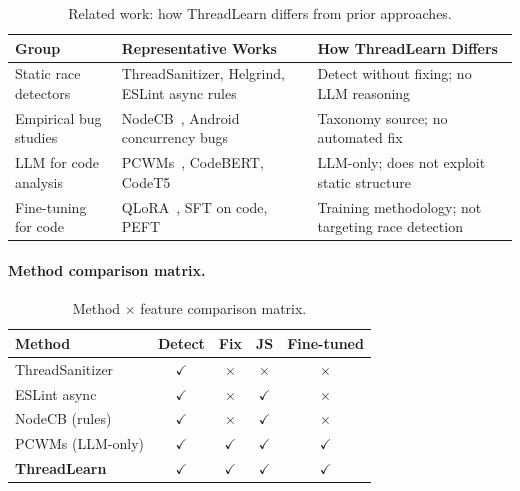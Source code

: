 \documentclass[11pt]{article}
\begin{document}
\begin{table}[ht]
  \centering
  \caption{Related work: how ThreadLearn differs from prior approaches.}
  \label{tab:related}
  \begin{tabular}{@{}p{3.2cm}p{4.5cm}p{4.5cm}@{}}
    \toprule
    \textbf{Group} & \textbf{Representative Works} & \textbf{How ThreadLearn Differs} \\
    \midrule
    Static race detectors
      & ThreadSanitizer, Helgrind, ESLint async rules
      & Detect without fixing; no LLM reasoning \\
    \addlinespace
    Empirical bug studies
      & NodeCB~\cite{nodecb2017}, Android concurrency bugs
      & Taxonomy source; no automated fix \\
    \addlinespace
    LLM for code analysis
      & PCWMs~\cite{pcwms2026}, CodeBERT, CodeT5
      & LLM-only; does not exploit static structure \\
    \addlinespace
    Fine-tuning for code
      & QLoRA~\cite{qlora}, SFT on code, PEFT
      & Training methodology; not targeting race detection \\
    \bottomrule
  \end{tabular}
\end{table}

\paragraph{Method comparison matrix.}

\begin{table}[ht]
  \centering
  \caption{Method $\times$ feature comparison matrix.}
  \label{tab:matrix}
  \begin{tabular}{@{}lcccc@{}}
    \toprule
    \textbf{Method} & \textbf{Detect} & \textbf{Fix} & \textbf{JS} & \textbf{Fine-tuned} \\
    \midrule
    ThreadSanitizer      & $\checkmark$ & $\times$ & $\times$     & $\times$ \\
    ESLint async         & $\checkmark$ & $\times$ & $\checkmark$ & $\times$ \\
    NodeCB (rules)       & $\checkmark$ & $\times$ & $\checkmark$ & $\times$ \\
    PCWMs (LLM-only)     & $\checkmark$ & $\checkmark$ & $\checkmark$ & $\checkmark$ \\
    \textbf{ThreadLearn} & $\checkmark$ & $\checkmark$ & $\checkmark$ & $\checkmark$ \\
    \bottomrule
  \end{tabular}
\end{table}
\end{document}
